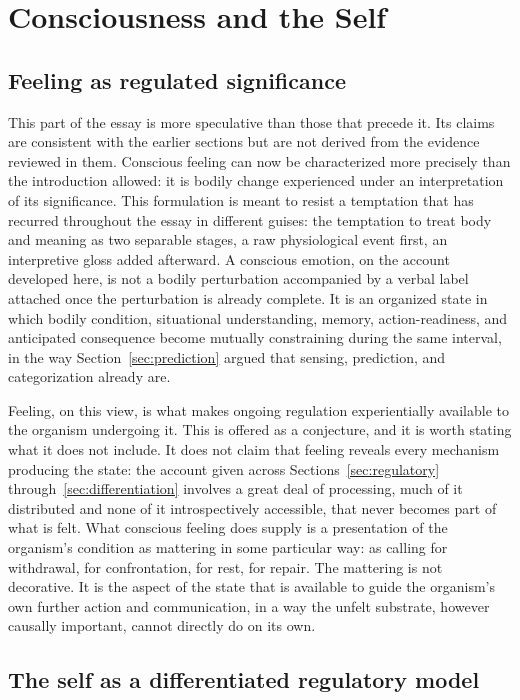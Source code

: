 \documentclass[11pt]{article}
\begin{document}
\section{Consciousness and the Self}\label{sec:consciousness}

\subsection{Feeling as regulated significance}

This part of the essay is more speculative than those that precede it. Its claims are consistent with the earlier sections but are not derived from the evidence reviewed in them. Conscious feeling can now be characterized more precisely than the introduction allowed: it is bodily change experienced under an interpretation of its significance. This formulation is meant to resist a temptation that has recurred throughout the essay in different guises: the temptation to treat body and meaning as two separable stages, a raw physiological event first, an interpretive gloss added afterward. A conscious emotion, on the account developed here, is not a bodily perturbation accompanied by a verbal label attached once the perturbation is already complete. It is an organized state in which bodily condition, situational understanding, memory, action-readiness, and anticipated consequence become mutually constraining during the same interval, in the way Section~\ref{sec:prediction} argued that sensing, prediction, and categorization already are.

Feeling, on this view, is what makes ongoing regulation experientially available to the organism undergoing it. This is offered as a conjecture, and it is worth stating what it does not include. It does not claim that feeling reveals every mechanism producing the state: the account given across Sections~\ref{sec:regulatory} through~\ref{sec:differentiation} involves a great deal of processing, much of it distributed and none of it introspectively accessible, that never becomes part of what is felt. What conscious feeling does supply is a presentation of the organism's condition as mattering in some particular way: as calling for withdrawal, for confrontation, for rest, for repair. The mattering is not decorative. It is the aspect of the state that is available to guide the organism's own further action and communication, in a way the unfelt substrate, however causally important, cannot directly do on its own.

\subsection{The self as a differentiated regulatory model}
\end{document}
